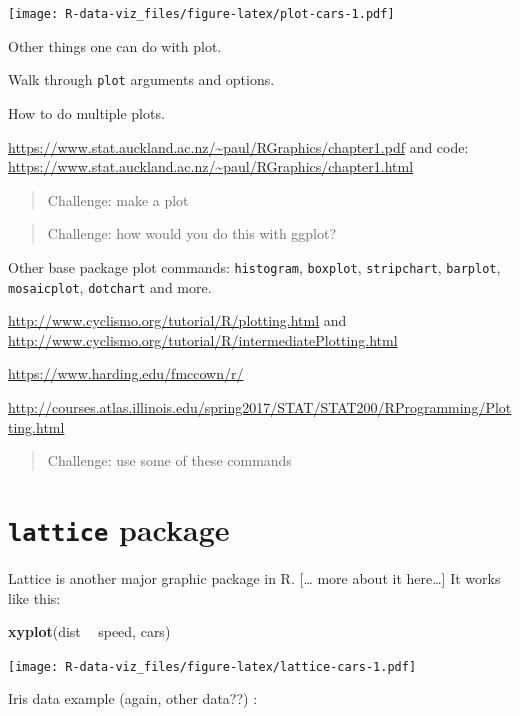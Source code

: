 \documentclass[]{book}
\newenvironment{Shaded}{\begin{snugshade}}{\end{snugshade}}
\newcommand{\KeywordTok}[1]{\textcolor[rgb]{0.13,0.29,0.53}{\textbf{#1}}}
\newcommand{\StringTok}[1]{\textcolor[rgb]{0.31,0.60,0.02}{#1}}
\newcommand{\OperatorTok}[1]{\textcolor[rgb]{0.81,0.36,0.00}{\textbf{#1}}}
\newcommand{\NormalTok}[1]{#1}
\theoremstyle{definition}
\theoremstyle{definition}
\theoremstyle{definition}
\theoremstyle{remark}
\begin{document}
\texttt{[image: R-data-viz\_files/figure-latex/plot-cars-1.pdf]}

Other things one can do with plot.

Walk through \texttt{plot} arguments and options.

How to do multiple plots.

\url{https://www.stat.auckland.ac.nz/~paul/RGraphics/chapter1.pdf} and
code:
\url{https://www.stat.auckland.ac.nz/~paul/RGraphics/chapter1.html}

\begin{quote}
Challenge: make a plot
\end{quote}

\begin{quote}
Challenge: how would you do this with ggplot?
\end{quote}

Other base package plot commands: \texttt{histogram}, \texttt{boxplot},
\texttt{stripchart}, \texttt{barplot}, \texttt{mosaicplot},
\texttt{dotchart} and more.

\url{http://www.cyclismo.org/tutorial/R/plotting.html} and
\url{http://www.cyclismo.org/tutorial/R/intermediatePlotting.html}

\url{https://www.harding.edu/fmccown/r/}

\url{http://courses.atlas.illinois.edu/spring2017/STAT/STAT200/RProgramming/Plotting.html}

\begin{quote}
Challenge: use some of these commands
\end{quote}

\section{\texorpdfstring{\texttt{lattice}
package}{lattice package}}\label{lattice-package}

Lattice is another major graphic package in R. {[}\ldots{} more about it
here\ldots{}{]} It works like this:

\begin{Shaded}
\begin{Highlighting}[]
\KeywordTok{xyplot}\NormalTok{(dist }\OperatorTok{~}\StringTok{ }\NormalTok{speed, cars)}
\end{Highlighting}
\end{Shaded}

\texttt{[image: R-data-viz\_files/figure-latex/lattice-cars-1.pdf]}

Iris data example (again, other data??) :
\end{document}
